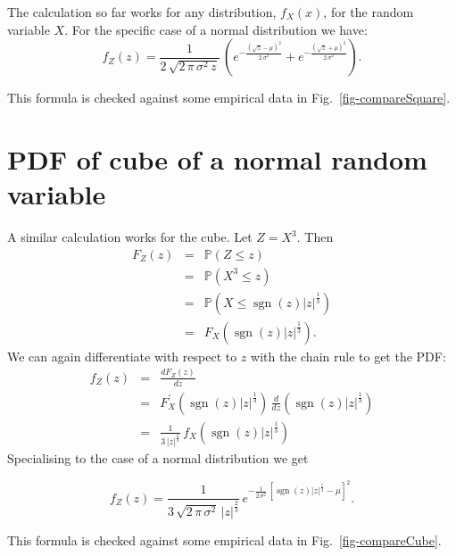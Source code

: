 \documentclass[11pt]{article}
\newcommand{\dd}[2]{\frac{d {#1}}{d {#2}}}
\DeclareMathOperator{\sgn}{sgn}
\begin{document}
\begin{multicols}{2}
The calculation so far works for any distribution, $f_X(x)$, for the random variable  $X$. For the specific case of a normal distribution we have:
\begin{equation}
\label{eq-squaredNormal}
f_Z(z) = \frac{1}{2\,\sqrt{2\,\pi\,\sigma^2\,z}} \, \left( e^{- \frac{(\sqrt{z}-\mu)^2}{2\,\sigma^2}} + e^{- \frac{(\sqrt{z}+\mu)^2}{2\,\sigma^2}} \right).
\end{equation}

This formula is checked against some empirical data in Fig.~\ref{fig-compareSquare}.

\section{PDF of cube of a normal random variable}
A similar calculation works for the cube. Let $Z=X^3$. Then
\begin{eqnarray*}
F_Z(z) &=& \mathbb{P}(Z \leq z)\\
&=& \mathbb{P}(X^3 \leq z)\\
&=& \mathbb{P}(X \leq \sgn(z)\left| z\right|^\frac{1}{3})\\
&=& F_X( \sgn(z)\left| z\right|^\frac{1}{3}).
\end{eqnarray*}
We can again differentiate with respect to $z$ with the chain rule to get the PDF:
\begin{eqnarray*}
f_Z(z) &=& \dd{F_Z(z)}{z}\\
&=& F_X^\prime(  \sgn(z)\left| z\right|^\frac{1}{3} ) \, \dd{ }{z} \left (  \sgn(z)\left| z\right|^\frac{1}{3} \right) \\
&=& \frac{1}{3\, \left| z\right|^\frac{2}{3}} \,  f_X( \sgn(z)\left| z\right|^\frac{1}{3}) 
\end{eqnarray*}
Specialising to the case of a normal distribution we get

\begin{equation}
\label{eq-cubedNormal}
f_Z(z) = \frac{1}{3\,\sqrt{2\,\pi\,\sigma^2}\,\left| z \right|^\frac{2}{3}} \, e^{- \frac{1}{2\,\sigma^2}\,\left[ \sgn(z)\left|z\right|^\frac{1}{3}-\mu \right]^2}.
\end{equation}

This formula is checked against some empirical data in Fig.~\ref{fig-compareCube}.


\end{multicols}
\end{document}

